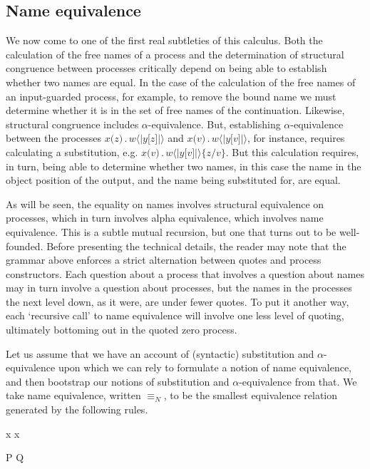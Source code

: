 \documentclass[]{amsart}
\newcommand{\lliftb}{\langle\!|}
\newcommand{\rliftb}{|\!\rangle}
\newcommand{\lpquote}{\ulcorner}
\newcommand{\rpquote}{\urcorner}
\newcommand{\id}[1]{\texttt{#1}}
\newcommand{\concat}{\mathbin{.}}
\newcommand{\scong}{\mathbin{\equiv}}
\newcommand{\nameeq}{\mathbin{\equiv_N}}
\newcommand{\lift}[2]{#1 \lliftb #2 \rliftb}
\newcommand{\quotep}[1]{\lpquote #1 \rpquote}
\newcommand{\dropn}[1]{\rpquote #1 \lpquote}
\theoremstyle{definition}
\theoremstyle{remark}
\numberwithin{equation}{subsection}
\begin{document}
\subsection{Name equivalence}

We now come to one of the first real subtleties of this calculus. Both
the calculation of the free names of a process and the determination
of structural congruence between processes critically depend on being
able to establish whether two names are equal. In the case of the
calculation of the free names of an input-guarded process, for
example, to remove the bound name we must determine whether it is in
the set of free names of the continuation. Likewise, structural
congruence includes $\alpha$-equivalence. But, establishing
$\alpha$-equivalence between the processes $x \id{(} z \id{)}\concat \lift{w}{y
\id{[}z\id{]}}$ and $x \id{(} v \id{)}\concat \lift{w}{y
\id{[}v\id{]}}$, for instance, requires calculating a substitution, e.g. $x \id{(} v \id{)}\concat \lift{w}{y
\id{[}v\id{]}} \id{\{}z / v \id{\}}$. But this calculation requires, in turn, being able to
determine whether two names, in this case the name in the object
position of the output, and the name being substituted for, are equal.

As will be seen, the equality on names involves structural equivalence
on processes, which in turn involves alpha equivalence, which involves
name equivalence. This is a subtle mutual recursion, but one that
turns out to be well-founded. Before presenting the technical details,
the reader may note that the grammar above enforces a strict
alternation between quotes and process constructors. Each question
about a process that involves a question about names may in turn
involve a question about processes, but the names in the processes the
next level down, as it were, are under fewer quotes. To put it another
way, each `recursive call' to name equivalence will involve one less
level of quoting, ultimately bottoming out in the quoted zero process.

Let us assume that we have an account of (syntactic) substitution and
$\alpha$-equivalence upon which we can rely to formulate a notion of
name equivalence, and then bootstrap our notions of substitution and
$\alpha$-equivalence from that. We take name equivalence, written
$\nameeq$, to be the smallest equivalence relation generated by the
following rules.


{ \quotep{\dropn{x}} \nameeq x }

\infrule[Struct-equiv]
{ P \scong Q }
{ \quotep{P} \nameeq \quotep{Q} }
\end{document}

